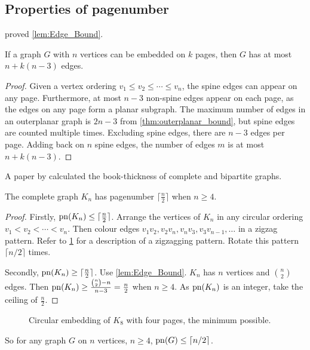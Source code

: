 \subsection{Properties of pagenumber}\label{ssec:Related_Properties}
\textcite{bernhartBookThicknessGraph1979} proved \cref{lem:Edge_Bound}.
\begin{proposition}\label{lem:Edge_Bound}
	If a graph \(G\) with $n$ vertices can be embedded on $k$ pages, then \(G\) has at most \(n + k(n-3)\) edges.
\end{proposition}
\begin{proof}
	Given a vertex ordering \(v_1 \leq v_2 \leq \cdots \leq v_n\), the spine edges can appear on any page. Furthermore, at most \(n-3\) non-spine edges appear on each page, as the edges on any page form a planar subgraph. The maximum number of edges in an outerplanar graph is \(2n - 3\) from \cref{thm:outerplanar_bound}, but spine edges are counted multiple times. Excluding spine edges, there are $n-3$ edges per page. Adding back on $n$ spine edges, the number of edges $m$ is at most $n + k (n - 3)$.
\end{proof}

A paper by \textcite{bernhartBookThicknessGraph1979} calculated the book-thickness of complete and bipartite graphs.

\begin{proposition}\label{thm:Pagenumber_Complete_Graph}
	The complete graph $K_n$ has pagenumber $\lceil \frac{n}{2} \rceil$ when $n \geq 4$.
\end{proposition}
\begin{proof}
	Firstly, $\operatorname{pn}(K_n) \leq \lceil \frac{n}{2} \rceil$. Arrange the vertices of $K_n$ in any circular ordering $v_1 < v_2 < \cdots < v_n$. Then colour edges $v_1 v_2, v_2 v_{n}, v_{n} v_{3}, v_{3} v_{n-1}, \ldots$ in a zigzag pattern. Refer to \cref{fig:k8 coloured with colours} for a description of a zigzagging pattern. Rotate this pattern $\lceil n/2 \rceil$ times. 

	Secondly, $\operatorname{pn}(K_n) \geq \lceil \frac{n}{2} \rceil$. Use \cref{lem:Edge_Bound}. \(K_n\) has \(n\) vertices and \(\binom{n}{2}\) edges. Then \(\operatorname{pn}(K_n) \geq \frac{\binom{n}{2} - n}{n - 3} = \frac{n}{2}\) when \(n \geq 4\). As \(\operatorname{pn}(K_n)\) is an integer, take the ceiling of \(\frac{n}{2}\).
\end{proof}
\begin{figure}[ht]
	\centering
	
	\caption[Embedding $K_8$ on four pages]{Circular embedding of \(K_8\) with four pages, the minimum possible.}\label{fig:k8 coloured with colours}
\end{figure}
So for any graph \(G\) on \(n\) vertices, \(n \geq 4\), \(\operatorname{pn}(G) \leq \lceil n/2 \rceil\).

